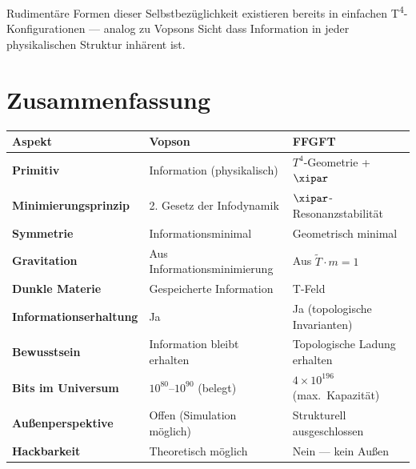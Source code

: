 Rudimentäre Formen dieser Selbstbezüglichkeit existieren bereits in einfachen
T\textsuperscript{4}-Konfigurationen --- analog zu Vopsons Sicht dass
Information in jeder physikalischen Struktur inhärent ist.

\section*{Zusammenfassung}

\begin{longtable}{>{\bfseries}p{5cm} p{4.5cm} p{4.5cm}}
\toprule
Aspekt & Vopson & FFGFT \\
\midrule
Primitiv & Information (physikalisch) & $T^4$-Geometrie + $\xipar$ \\
Minimierungsprinzip & 2. Gesetz der Infodynamik & $\xipar$-Resonanzstabilität \\
Symmetrie & Informationsminimal & Geometrisch minimal \\
Gravitation & Aus Informationsminimierung & Aus $\tilde{T} \cdot m = 1$ \\
Dunkle Materie & Gespeicherte Information & T-Feld \\
Informationserhaltung & Ja & Ja (topologische Invarianten) \\
Bewusstsein & Information bleibt erhalten & Topologische Ladung erhalten \\
Bits im Universum & $10^{80}$--$10^{90}$ (belegt) & $4\times10^{196}$ (max.\ Kapazität) \\
Außenperspektive & Offen (Simulation möglich) & Strukturell ausgeschlossen \\
Hackbarkeit & Theoretisch möglich & Nein --- kein Außen \\
\bottomrule
\end{longtable}
